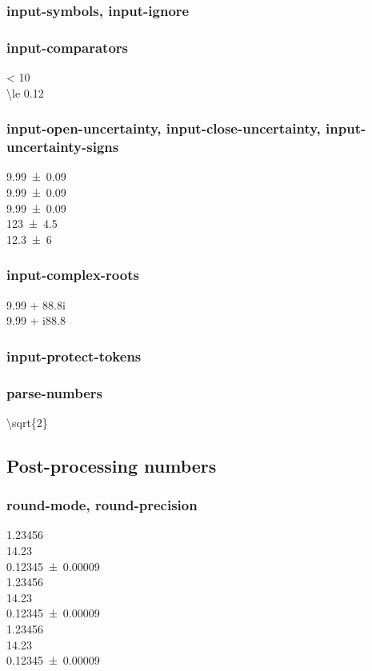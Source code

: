\documentclass{article}
\begin{document}
\subsubsection{input-symbols, input-ignore}
\subsubsection{input-comparators}

\num{< 10} \\
\num{\le 0.12}\\

\subsubsection{input-open-uncertainty, input-close-uncertainty, input-uncertainty-signs}
\num{9.99(9)}\\
\num{9.99 +- 0.09}\\
\num{9.99 \pm 0.09}\\
\num{123 +- 4.5}\\
\num{12.3 +- 6}\\

\subsubsection{input-complex-roots}
\num{9.99 + 88.8i} \\
\num{9.99 + i88.8}\\

\subsubsection{input-protect-tokens}

\subsubsection{parse-numbers}
\num[parse-numbers = false]{\sqrt{2}}\\

\subsection{Post-processing numbers}
\subsubsection{round-mode, round-precision}
{
\num{1.23456} \\
\num{14.23} \\
\num{0.12345(9)} \\
%
\num{1.23456} \\
\num{14.23} \\
\num{0.12345(9)} \\
%
\num{1.23456} \\
\num{14.23} \\
\num{0.12345(9)}\\
}
\end{document}

